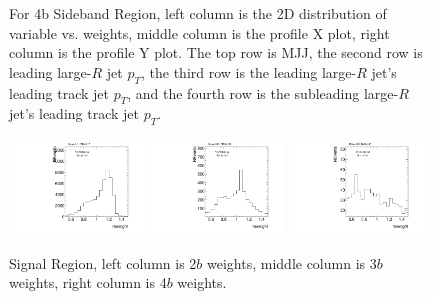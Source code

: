 \begin{figure}[htbp!]
\begin{center}
\caption{For 4b Sideband Region, left column is the 2D distribution of variable vs. weights, middle column is the profile X plot, right column is the profile Y plot. The top row is MJJ, the second row is leading large-$R$ jet $p_{T}$, the third row is the leading large-$R$ jet's leading track jet $p_{T}$, and the fourth row is the subleading large-$R$ jet's leading track jet $p_{T}$.}
\label{fig:app-reweight-dist-4b-SB}
\end{center}
\end{figure}


\begin{figure}[htbp!]
\begin{center}
\includegraphics[angle=270, width=0.32\textwidth]{./figures/boosted/AppendixReweight/Weights/2Trk_split_Signal_leadHCand_Pt_m_weight_projy.pdf}
\includegraphics[angle=270, width=0.32\textwidth]{./figures/boosted/AppendixReweight/Weights/3Trk_Signal_leadHCand_Pt_m_weight_projy.pdf}
\includegraphics[angle=270, width=0.32\textwidth]{./figures/boosted/AppendixReweight/Weights/4Trk_Signal_leadHCand_Pt_m_weight_projy.pdf}\\
\caption{Signal Region, left column is 2$b$ weights, middle column is 3$b$ weights, right column is 4$b$ weights.}
\label{fig:app-reweight-dist-weights-SR}
\end{center}
\end{figure}

